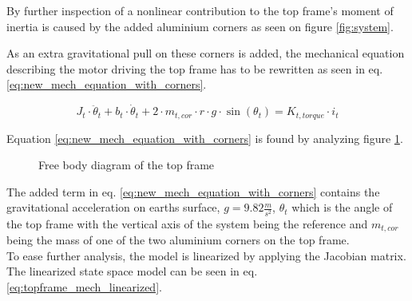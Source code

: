\documentclass[../../main]{subfiles}
\begin{document}
By further inspection of a nonlinear contribution to the top frame's moment of inertia is caused by the added aluminium corners as seen on figure \ref{fig:system}.

As an extra gravitational pull on these corners is added, the mechanical equation describing the motor driving the top frame has to be rewritten as seen in eq. \eqref{eq:new_mech_equation_with_corners}.

\begin{equation}
  \label{eq:new_mech_equation_with_corners}
  J_t\cdot \ddot \theta_t + b_t\cdot \dot \theta_t + 2\cdot m_{t,cor} \cdot r \cdot g \cdot \sin(\theta_t) = K_{t,torque}\cdot i_t
\end{equation}

Equation \eqref{eq:new_mech_equation_with_corners} is found by analyzing figure \ref{fig:TrekantDiagramForce}.

\begin{figure}[H]
  \centering
  \def\svgwidth{0.4\columnwidth}
  
  \caption{Free body diagram of the top frame}
  \label{fig:TrekantDiagramForce}
\end{figure}

The added term in eq. \eqref{eq:new_mech_equation_with_corners} contains the gravitational acceleration on earths surface, $g = 9.82 \si{\frac{m}{s^2}}$, $\theta_t$ which is the angle of the top frame with the vertical axis of the system being the reference and $m_{t,cor}$ being the mass of one of the two aluminium corners on the top frame.\\
To ease further analysis, the model is linearized by applying the Jacobian matrix. The linearized state space model can be seen in eq. \eqref{eq:topframe_mech_linearized}.
\end{document}

